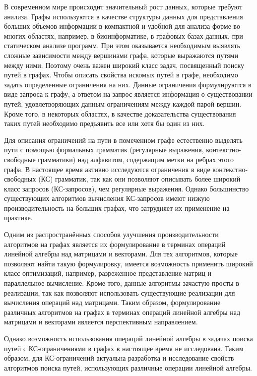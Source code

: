 
{\actuality} 
В современном мире происходит значительный рост данных, которые требуют анализа. Графы используются в качестве структуры данных для представления больших объемов информации в компактной и удобной для анализа форме во многих областях, например, в биоинформатике, в графовых базах данных, при статическом анализе программ. При этом оказывается необходимым выявлять сложные зависимости между вершинами графа, которые выражаются путями между ними. Поэтому очень важен широкий класс задач, посвященный поиску путей в графах. Чтобы описать свойства искомых путей в графе, необходимо задать определенные ограничения на них. Данные ограничения формулируются в виде запроса к графу, а ответом на запрос является информация о существовании путей, удовлетворяющих данным ограничениям между каждой парой вершин. Кроме того, в некоторых областях, в качестве доказательства существования таких путей необходимо предъявить все или хотя бы один из них.

Для описания ограничений на пути в помеченном графе естественно выделять пути с помощью формальных грамматик (регулярные выражения, контекстно-свободные грамматики) над алфавитом, содержащим метки на ребрах этого графа. В настоящее время активно исследуются ограничения в виде контекстно-свободных (КС) грамматик, так как они позволяют описывать более широкий класс запросов (КС-запросов), чем регулярные выражения. Однако большинство существующих алгоритмов вычисления КС-запросов имеют низкую производительность на больших графах, что затрудняет их применение на практике.

Одним из распространённых способов улучшения производительности алгоритмов на графах является их формулирование в терминах операций линейной алгебры над матрицами и векторами. Для тех алгоритмов, которые позволяют найти такую формулировку, имеется возможность применить широкий класс оптимизаций, например, разреженное представление матриц и параллельное вычисление. Кроме того, данные алгоритмы зачастую просты в реализации, так как позволяют использовать существующие реализации для вычисления операций над матрицами. Таким образом, формулирование различных алгоритмов на графах в терминах операций линейной алгебры над матрицами и векторами является перспективным направлением.

Однако возможность использования операций линейной алгебры в задачах поиска путей с КС-ограничениями в графах в настоящее время не исследована. Таким образом, для КС-ограничений актуальна разработка и исследование свойств алгоритмов поиска путей, использующих различные операции линейной алгебры.

